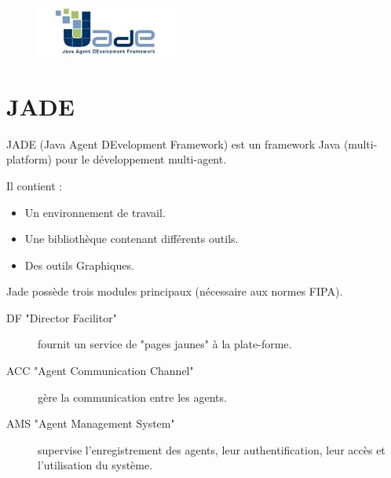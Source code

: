 \documentclass{beamer}
\begin{document}

  \begin{frame}
    \begin{figure}[H]
      \centering
      \includegraphics[scale=1]{image/logo.jpg} 
      \label{fig:logo}
    \end{figure}
   
  \end{frame}

   \section{JADE}
  \begin{frame}
    JADE (Java Agent DEvelopment Framework) est un framework Java (multi-platform) pour le développement multi-agent.
    
    Il contient :
    \begin{itemize}
      \item Un environnement de travail.
      \item Une bibliothèque contenant différents outils.
      \item Des outils Graphiques.
    \end{itemize}
  \end{frame}
  
  \begin{frame}
    Jade possède trois modules principaux (nécessaire aux normes FIPA).
    
    \begin{description}
      \item[DF "Director Facilitor"] fournit un service de "pages jaunes" à la plate-forme.
      \item[ACC "Agent Communication Channel"] gère la communication entre les agents.
      \item[AMS "Agent Management System"] supervise l'enregistrement des agents, leur authentification, leur accès et l'utilisation du système.
    \end{description}
  \end{frame}
  
\end{document}
